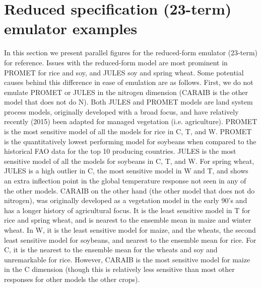 \documentclass[10pt]{article}
\begin{document}
{{\section{Reduced specification (23-term) emulator examples}
\smallskip
\begin{flushleft}
In this section we present parallel figures for the reduced-form emulator (23-term) for reference. 
Issues with the reduced-form model are most prominent in PROMET for rice and soy, and JULES soy and spring wheat. 
Some potential causes behind this difference in ease of emulation are as follows.
First, we do not emulate PROMET or JULES in the nitrogen dimension (CARAIB is the other model that does not do N). 
Both JULES and PROMET models are land system process models, originally developed with a broad focus, and have relatively recently (2015) been adapted for managed vegetation (i.e. agriculture).
PROMET is the most sensitive model of all the models for rice in C, T, and W. 
PROMET is the quantitatively lowest performing model for soybeans when compared to the historical FAO data for the top 10 producing countries. 
JULES is the most sensitive model of all the models for soybeans in C, T, and W. 
For spring wheat, JULES is a high outlier in C, the most sensitive model in W and T, and shows an extra inflection point in the global temperature response not seen in any of the other models. 
CARAIB on the other hand (the other model that does not do nitrogen), was originally developed as a vegetation model in the early 90's and has a longer history of agricultural focus. It is the least sensitive model in T for rice and spring wheat, and is nearest to the ensemble mean in maize and winter wheat. 
In W, it is the least sensitive model for maize, and the wheats, the second least sensitive model for soybeans, and nearest to the ensemble mean for rice. 
For C, it is the nearest to the ensemble mean for the wheats and soy and unremarkable for rice. 
However, CARAIB is the most sensitive model for maize in the C dimension (though this is relatively less sensitive than most other responses for other models the other crops).
\end{flushleft}

}}
\end{document}
